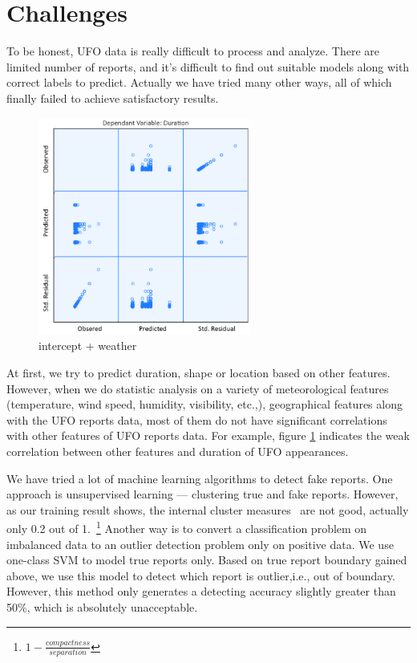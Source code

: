 \section{Challenges}\label{challenge}
To be honest, UFO data is really difficult to process and analyze. There are limited number of reports, and it's difficult to find out suitable models along with correct labels to predict. Actually we have tried many other ways, all of which finally failed to achieve satisfactory results.

\begin{figure}[H]
    \centering
    \includegraphics[width=7cm]{figure/correlation.png}
    \caption{intercept + weather}
    \label{correlation}
\end{figure}

At first, we try to predict duration, shape or location based on other features. However, when we do statistic analysis on a variety of meteorological features (temperature, wind speed, humidity, visibility, etc.,), geographical features along with the UFO reports data, most of them do not have significant correlations with other features of UFO reports data. For example, figure \ref{correlation} indicates the weak correlation between other features and duration of UFO appearances.

We have tried a lot of machine learning algorithms to detect fake reports. One approach is unsupervised learning --- clustering true and fake reports. However, as our training result shows, the internal cluster measures~\cite{clustermeasure} are not good, actually only 0.2 out of 1.~\footnote{$ 1 - \frac{compactness}{separation} $} Another way is to convert a classification problem on imbalanced data to an outlier detection problem only on positive data. We use one-class SVM to model true reports only. Based on true report boundary gained above, we use this model to detect which report is outlier,i.e., out of boundary. However, this method only generates a detecting accuracy slightly greater than 50\%, which is absolutely unacceptable.